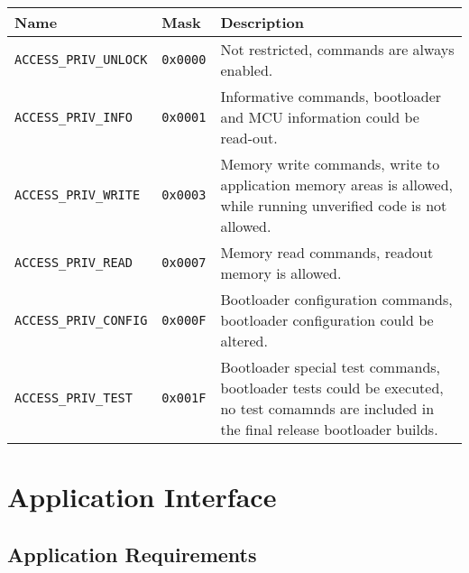 \begin{table*}[!ht]
  \hspace*{-4cm}
  \begin{tabular}{| p{4cm} | p{1.5cm} | p{8.5cm} | }
      \hline
      \rowcolor{SeaGreen3!30!} {\bf Name} & {\bf Mask} & {\bf Description} \\
      \hline
      \hline
      {\tt ACCESS\_PRIV\_UNLOCK} & {\tt 0x0000} & Not restricted, commands are always enabled.\\
      \hline
      {\tt ACCESS\_PRIV\_INFO} & {\tt 0x0001} & Informative commands, bootloader and MCU information could be read-out.\\
      \hline
      {\tt ACCESS\_PRIV\_WRITE} & {\tt 0x0003} & Memory write commands, write to application memory areas is allowed, while running unverified code is not allowed.\\
      \hline
      {\tt ACCESS\_PRIV\_READ} & {\tt 0x0007} & Memory read commands, readout memory is allowed.\\
      \hline
      {\tt ACCESS\_PRIV\_CONFIG} & {\tt 0x000F} & Bootloader configuration commands, bootloader configuration could be altered.\\
      \hline
      {\tt ACCESS\_PRIV\_TEST} & {\tt 0x001F} & Bootloader special test commands, bootloader tests could be executed, no test comamnds are included in the final release bootloader builds.\\
      \hline
  \end{tabular}
\end{table*}



   
   
\clearpage
\section{Application Interface}

\subsection{Application Requirements}
